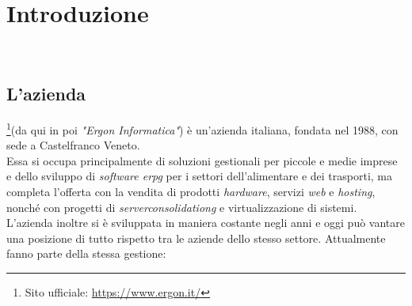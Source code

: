 

\chapter{Introduzione}
\label{cap:introduzione}

\noindent {}\\





\section{L'azienda}

\noindent{\myCompany}\footnote[1]{Sito ufficiale: \url{https://www.ergon.it/}}(da qui in poi
\textit{"Ergon Informatica"}) è un'azienda italiana, fondata nel 1988, 
con sede a Castelfranco Veneto.\\
Essa si occupa principalmente di soluzioni gestionali per piccole e medie imprese e dello sviluppo di
\textit{software \gls{erpg}} per i settori dell'alimentare e dei trasporti,
ma completa l'offerta con la vendita di prodotti
\textit{hardware}, servizi \textit{web} e \textit{hosting}, nonché con progetti di \textit{\gls{serverconsolidationg}} e virtualizzazione di
sistemi.
L'azienda inoltre si è sviluppata in maniera costante negli anni e oggi può vantare una posizione di tutto rispetto tra le aziende dello stesso settore.
Attualmente fanno parte della stessa gestione:

